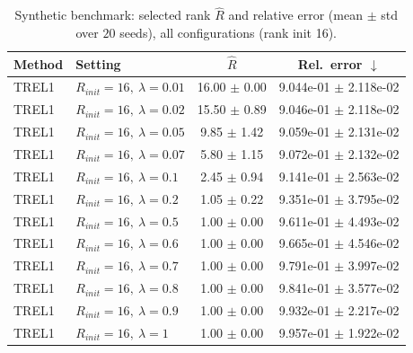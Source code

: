 \begin{table}[t]
\centering
\caption{Synthetic benchmark: selected rank \(\hat R\) and relative error (mean \(\pm\) std over \(20\) seeds), all configurations (rank init 16).}
\label{tab:results_synth_all}
\begin{tabular}{@{}llcc@{}}
\toprule
Method & Setting & \(\hat R\) & Rel.\ error \(\downarrow\) \\ \midrule
TREL1 & \(R_{init}=16,\ \lambda=0.01\) & 16.00 $\pm$ 0.00 & 9.044e-01 $\pm$ 2.118e-02 \\
TREL1 & \(R_{init}=16,\ \lambda=0.02\) & 15.50 $\pm$ 0.89 & 9.046e-01 $\pm$ 2.118e-02 \\
TREL1 & \(R_{init}=16,\ \lambda=0.05\) & 9.85 $\pm$ 1.42 & 9.059e-01 $\pm$ 2.131e-02 \\
TREL1 & \(R_{init}=16,\ \lambda=0.07\) & 5.80 $\pm$ 1.15 & 9.072e-01 $\pm$ 2.132e-02 \\
TREL1 & \(R_{init}=16,\ \lambda=0.1\) & 2.45 $\pm$ 0.94 & 9.141e-01 $\pm$ 2.563e-02 \\
TREL1 & \(R_{init}=16,\ \lambda=0.2\) & 1.05 $\pm$ 0.22 & 9.351e-01 $\pm$ 3.795e-02 \\
TREL1 & \(R_{init}=16,\ \lambda=0.5\) & 1.00 $\pm$ 0.00 & 9.611e-01 $\pm$ 4.493e-02 \\
TREL1 & \(R_{init}=16,\ \lambda=0.6\) & 1.00 $\pm$ 0.00 & 9.665e-01 $\pm$ 4.546e-02 \\
TREL1 & \(R_{init}=16,\ \lambda=0.7\) & 1.00 $\pm$ 0.00 & 9.791e-01 $\pm$ 3.997e-02 \\
TREL1 & \(R_{init}=16,\ \lambda=0.8\) & 1.00 $\pm$ 0.00 & 9.841e-01 $\pm$ 3.577e-02 \\
TREL1 & \(R_{init}=16,\ \lambda=0.9\) & 1.00 $\pm$ 0.00 & 9.932e-01 $\pm$ 2.217e-02 \\
TREL1 & \(R_{init}=16,\ \lambda=1\) & 1.00 $\pm$ 0.00 & 9.957e-01 $\pm$ 1.922e-02 \\
\bottomrule
\end{tabular}
\end{table}